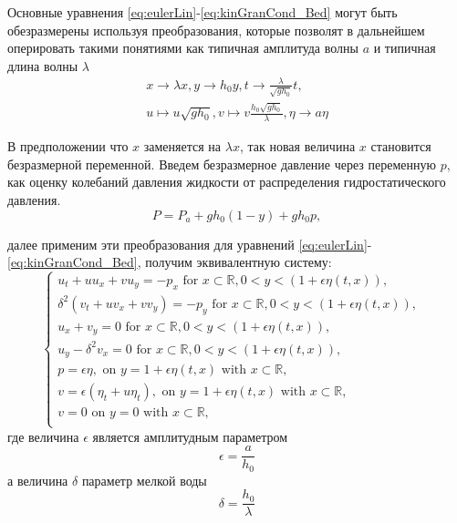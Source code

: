 Основные уравнения \eqref{eq:eulerLin}-\eqref{eq:kinGranCond_Bed} могут быть обезразмерены \cite{17_Johnson} используя преобразования, которые позволят в дальнейшем оперировать такими понятиями как типичная амплитуда волны $a$ и типичная длина волны $\lambda$
\begin{multline}\label{eq:normalizeLin}
    x\rightarrow \lambda x, y\rightarrow h_0y, t\rightarrow \frac{\lambda}{\sqrt{gh_0}}t, \\
    u\mapsto u\sqrt{gh_0}, v\mapsto v\frac{h_0\sqrt{gh_0}}{\lambda}, \eta \rightarrow a\eta
\end{multline}

В предположении что $x$ заменяется на $\lambda x$, так новая величина $x$ становится безразмерной переменной. Введем безразмерное давление через переменную $p$, как оценку колебаний давления жидкости от распределения гидростатического давления.
\begin{equation}\label{eq:normPressure}
   P = P_a + gh_0(1 - y) + gh_0p,
\end{equation}

далее применим эти преобразования для уравнений \eqref{eq:eulerLin}-\eqref{eq:kinGranCond_Bed}, получим эквивалентную систему:
\begin{equation}\label{eq:eulerLinNorm1}
    \begin{cases}
         u_t + uu_x + vu_y = -p_x\text{ for } x\subset\mathbb{R}, 0<y<(1 + \epsilon\eta(t, x)), & \\
         \delta^2(v_t + uv_x + vv_y ) = -p_y \text{ for } x\subset\mathbb{R}, 0<y<(1 + \epsilon\eta(t, x)), & \\
         u_x + v_y = 0\text{ for }x\subset\mathbb{R}, 0<y<(1 + \epsilon\eta(t, x)), & \\
         u_y - \delta^2v_x = 0 \text{ for } x\subset\mathbb{R}, 0<y<(1 + \epsilon\eta(t, x)), & \\
         p=\epsilon\eta,   \text{ on } y=1+\epsilon\eta(t, x) \text{ with } x\subset\mathbb{R}, & \\
         v = \epsilon(\eta_t+u\eta_t), \text{ on } y=1+\epsilon\eta(t, x) \text{ with } x\subset\mathbb{R}, & \\
         v = 0 \text{ on } y = 0 \text{ with } x\subset\mathbb{R}, & \\
    \end{cases}
  \end{equation}
где величина $\epsilon$ является амплитудным параметром
\begin{equation}\label{eq:epsilon}
  \epsilon=\frac{a}{h_0}
\end{equation}
а величина $\delta$ параметр мелкой воды
\begin{equation}\label{eq:epsilon}
  \delta=\frac{h_0}{\lambda}
\end{equation}


